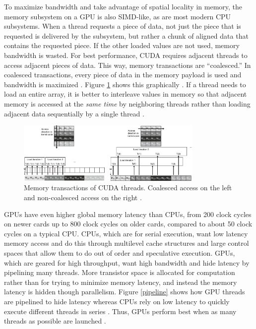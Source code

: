 To maximize bandwidth and take advantage of spatial locality in memory, the memory subsystem on a GPU is also SIMD-like, as are most modern CPU subsystems.  When a thread requests a piece of data, not just the piece that is requested is delivered by the subsystem, but rather a chunk of aligned data that contains the requested piece.  If the other loaded values are not used, memory bandwidth is wasted.  For best performance, CUDA requires adjacent threads to access adjacent pieces of data.  This way, memory transactions are ``coalesced.''   In coalesced transactions, every piece of data in the memory payload is used and bandwidth is maximized \cite{cuda}.  Figure \ref{coalesced} shows this graphically \cite{programming_massively}.  If a thread needs to load an entire array, it is better to interleave values in memory so that adjacent memory is accessed at the \emph{same time} by neighboring threads rather than loading adjacent data sequentially by a single thread \cite{cuda}.

\begin{figure}[h!] 
  \centering
    \includegraphics[width=0.8\textwidth]{graphics/coalesced.eps}
     \caption[Memory transactions of CUDA threads.]{Memory transactions of CUDA threads.  Coalesced access on the left and non-coalesced access on the right \cite{programming_massively}. \label{coalesced}}
\end{figure}

GPUs have even higher global memory latency than CPUs, from 200 clock cycles on newer cards up to 800 clock cycles on older cards, compared to about 50 clock cycles on a typical CPU.  CPUs, which are for serial execution, want low latency memory access and do this through multilevel cache structures and large control spaces that allow them to do out of order and speculative execution.  GPUs, which are geared for high throughput, want high bandwidth and hide latency by pipelining many threads.  More transistor space is allocated for computation rather than for trying to minimize memory latency, and instead the memory latency is hidden though parallelism.  Figure \ref{pipeline} shows how GPU threads are pipelined to hide latency whereas CPUs rely on low latency to quickly execute different threads in series \cite{cuda_gtc_pres}.  Thus, GPUs perform best when as many threads as possible are launched \cite{cuda}.

